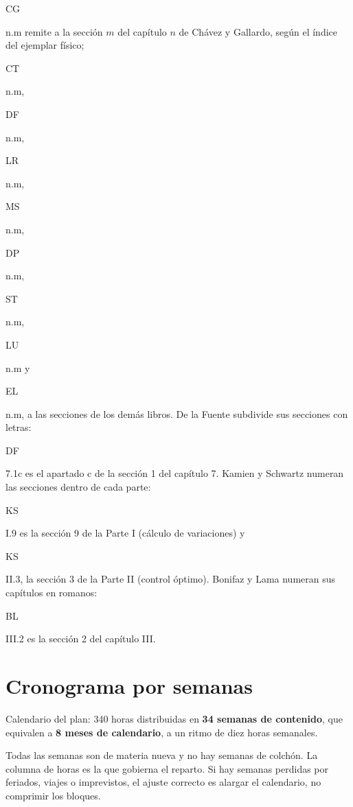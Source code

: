 \documentclass[11pt,a4paper]{article}
\newcommand{\destacado}[1]{{\sffamily\bfseries\color{tonoPrincipal}#1}}
\newcommand{\etiqueta}[2]{%
  {\setlength{\fboxsep}{1.4pt}\colorbox{#1}{\sffamily\bfseries\color{white}\strut#2}}}
\newcommand{\CG}[1]{\etiqueta{colorCG}{CG}\nobreak\hspace{0.25em}\textcolor{colorCG}{#1}}
\newcommand{\CT}[1]{\etiqueta{colorCT}{CT}\nobreak\hspace{0.25em}\textcolor{colorCT}{#1}}
\newcommand{\DF}[1]{\etiqueta{colorDF}{DF}\nobreak\hspace{0.25em}\textcolor{colorDF}{#1}}
\newcommand{\KS}[1]{\etiqueta{colorKS}{KS}\nobreak\hspace{0.25em}\textcolor{colorKS}{#1}}
\newcommand{\LR}[1]{\etiqueta{colorLR}{LR}\nobreak\hspace{0.25em}\textcolor{colorLR}{#1}}
\newcommand{\MS}[1]{\etiqueta{colorMS}{MS}\nobreak\hspace{0.25em}\textcolor{colorMS}{#1}}
\newcommand{\DP}[1]{\etiqueta{colorDP}{DP}\nobreak\hspace{0.25em}\textcolor{colorDP}{#1}}
\newcommand{\ST}[1]{\etiqueta{colorST}{ST}\nobreak\hspace{0.25em}\textcolor{colorST}{#1}}
\newcommand{\BL}[1]{\etiqueta{colorBL}{BL}\nobreak\hspace{0.25em}\textcolor{colorBL}{#1}}
\newcommand{\LU}[1]{\etiqueta{colorLU}{LU}\nobreak\hspace{0.25em}\textcolor{colorLU}{#1}}
\newcommand{\EL}[1]{\etiqueta{colorEL}{EL}\nobreak\hspace{0.25em}\textcolor{colorEL}{#1}}
\begin{document}
\medskip
\noindent\destacado{Notación.} \CG{n.m} remite a la sección $m$ del capítulo $n$
de Chávez y Gallardo, según el índice del ejemplar físico; \CT{n.m}, \DF{n.m},
\LR{n.m}, \MS{n.m}, \DP{n.m}, \ST{n.m}, \LU{n.m} y \EL{n.m}, a las secciones de
los demás libros. De la Fuente subdivide sus secciones con letras: \DF{7.1c}
es el apartado c de la sección 1 del capítulo 7. Kamien y Schwartz numeran
las secciones dentro de cada parte: \KS{I.9} es la sección 9 de la Parte I
(cálculo de variaciones) y \KS{II.3}, la sección 3 de la Parte II (control
óptimo). Bonifaz y Lama numeran sus capítulos en romanos: \BL{III.2} es la
sección 2 del capítulo III.

\newpage
\section*{Cronograma por semanas}

Calendario del plan: 340 horas distribuidas en \textbf{34 semanas de
contenido}, que equivalen a \textbf{8 meses de calendario}, a un ritmo de diez
horas semanales.

\medskip
\noindent Todas las semanas son de materia nueva y no hay semanas de colchón.
La columna de horas es la que gobierna el reparto. Si hay semanas perdidas por
feriados, viajes o imprevistos, el ajuste correcto es alargar el calendario,
no comprimir los bloques.
\end{document}
